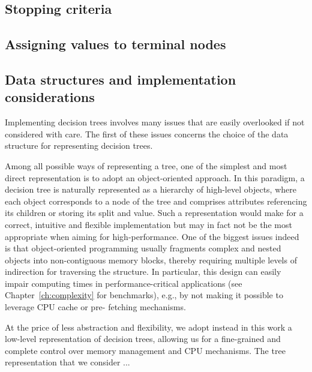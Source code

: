 \subsection{Stopping criteria}



\subsection{Assigning values to terminal nodes}
\label{sec:3:assignment}




\subsection{Data structures and implementation considerations}

Implementing decision trees involves many issues that are easily overlooked if
not considered with care. The first of these issues concerns the choice of the
data structure for representing decision trees.

Among all possible ways of representing a tree, one of the simplest and most
direct representation is to adopt an object-oriented approach. In this
paradigm, a decision tree is naturally represented as a hierarchy of high-level
objects, where each object corresponds to a node of the tree and comprises
attributes referencing its children or storing its split and value. Such a
representation would make for a correct, intuitive and flexible implementation
but may in fact not be the most appropriate when aiming for high-performance.
One of the biggest issues indeed is that object-oriented programming usually
fragments complex and nested objects into non-contiguous memory blocks, thereby
requiring multiple levels of indirection for traversing the structure. In
particular, this design can easily impair computing times in
performance-critical applications (see Chapter~\ref{ch:complexity} for
benchmarks), e.g., by not making it possible to leverage CPU cache or pre-
fetching mechanisms.

At the price of less abstraction and flexibility, we adopt instead in this work
a low-level representation of decision trees, allowing us for a fine-grained
and complete control over memory management and CPU mechanisms. The tree
representation that we consider ...

